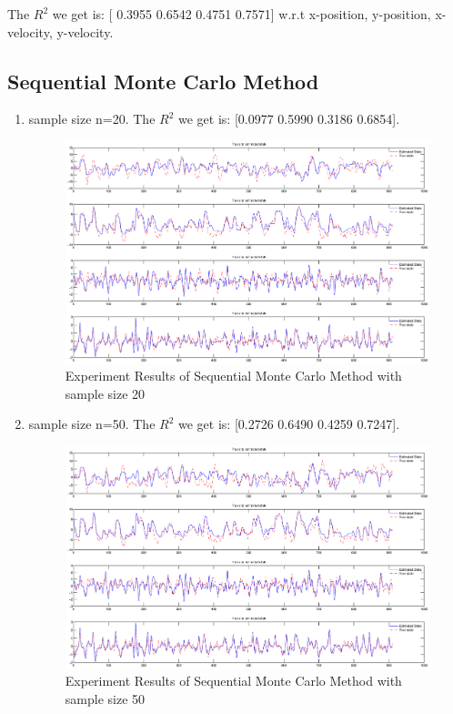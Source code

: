 \documentclass[12pt,letterpaper]{article}
\begin{document}
The $R^2$ we get is: [ 0.3955 0.6542 0.4751  0.7571] w.r.t x-position, y-position, x-velocity, y-velocity. 

\subsection{Sequential Monte Carlo Method}

\begin{enumerate}


\item sample size n=20. The $R^2$ we get is: [0.0977  0.5990  0.3186   0.6854].

\begin{figure}
\begin{center}
\includegraphics[width=0.9\linewidth]{SMC20.eps}
\caption{Experiment Results of Sequential Monte Carlo Method with sample size 20}
\label{fig:database}
\end{center}
\end{figure}


\item sample size n=50. The $R^2$ we get is: [0.2726 0.6490  0.4259  0.7247].

\begin{figure}
\begin{center}
\includegraphics[width=0.9\linewidth]{SMC50.eps}
\caption{Experiment Results of Sequential Monte Carlo Method with sample size 50}
\label{fig:database}
\end{center}
\end{figure}



\end{enumerate}
\end{document}
